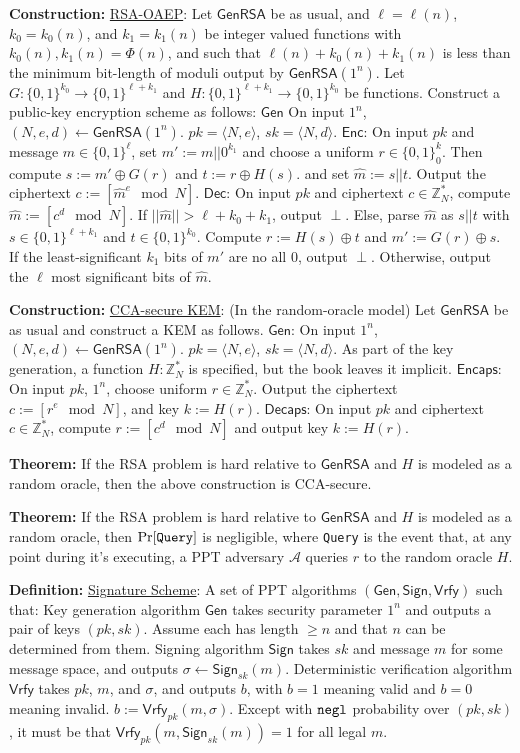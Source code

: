 \documentclass[10pt]{article}
\newcommand{\Z}{\mathbb{Z}}
\newcommand{\AAA}{\mathcal{A}}
\newcommand{\defn}[1]{{\bf Definition:} \underline{#1}}
\newcommand{\thm}[1]{{\bf Theorem:} \underline{#1}}
\newcommand{\con}[1]{{\bf Construction:} \underline{#1}}
\newcommand{\Enc}{\mathsf{Enc}}
\newcommand{\Dec}{\mathsf{Dec}}
\newcommand{\Encaps}{\mathsf{Encaps}}
\newcommand{\Decaps}{\mathsf{Decaps}}
\newcommand{\Sign}{\mathsf{Sign}}
\newcommand{\Vrfy}{\mathsf{Vrfy}}
\newcommand{\Gen}{\mathsf{Gen}}
\newcommand{\GenRSA}{\mathsf{GenRSA}}
\newcommand{\ang}[1]{\langle#1\rangle}
\newcommand{\xor}{\oplus}
\newcommand{\negl}{{\tt negl}}
\newcommand{\from}{\leftarrow}
\begin{document}
\begin{multicols}{3}
\con{RSA-OAEP}: Let $\GenRSA$ be as usual, and $\ell=\ell(n)$, $k_0=k_0(n)$, and $k_1=k_1(n)$ be integer valued functions with $k_0(n),k_1(n)=\Phi(n)$, and such that $\ell(n)+k_0(n)+k_1(n)$ is less than the minimum bit-length of moduli output by $\GenRSA(1^n)$. Let $G:\{0,1\}^{k_0}\to\{0,1\}^{\ell+k_1}$ and $H:\{0,1\}^{\ell+k_1}\to\{0,1\}^{k_0}$ be functions. Construct a public-key encryption scheme as follows: $\Gen$ On input $1^n$, $(N,e,d)\from\GenRSA(1^n)$. $pk=\ang{N,e}$, $sk=\ang{N,d}$. $\Enc$: On input $pk$ and message $m\in\{0,1\}^\ell$, set $m':=m||0^{k_1}$ and choose a uniform $r\in\{0,1\}^k_0$. Then compute $s:=m'\xor G(r)$ and $t:=r\xor H(s)$. and set $\hat{m}:=s||t$. Output the ciphertext $c:=[\hat{m}^e\mod{N}]$. $\Dec$: On input $pk$ and ciphertext $c\in\Z_N^*$, compute $\hat{m}:=[c^d\mod{N}]$. If $||\hat{m}||>\ell+k_0+k_1$, output $\perp$. Else, parse $\hat{m}$ as $s||t$ with $s\in\{0,1\}^{\ell+k_1}$ and $t\in\{0,1\}^{k_0}$. Compute $r:=H(s)\xor t$ and $m':=G(r)\xor s$. If the least-significant $k_1$ bits of $m'$ are no all $0$, output $\perp$. Otherwise, output the $\ell$ most significant bits of $\hat{m}$.

\con{CCA-secure KEM}: (In the random-oracle model) Let $\GenRSA$ be as usual and construct a KEM as follows. $\Gen$: On input $1^n$, $(N,e,d)\from\GenRSA(1^n)$. $pk=\ang{N,e}$, $sk=\ang{N,d}$. As part of the key generation, a function $H:\Z_N^*$ is specified, but the book leaves it implicit. $\Encaps$: On input $pk$, $1^n$, choose uniform $r\in\Z_N^*$. Output the ciphertext $c:=[r^e\mod{N}]$, and key $k:=H(r)$. $\Decaps$: On input $pk$ and ciphertext $c\in\Z_N^*$, compute $r:=[c^d\mod{N}]$ and output key $k:=H(r)$.

\thm{} If the RSA problem is hard relative to $\GenRSA$ and $H$ is modeled as a random oracle, then the above construction is CCA-secure.

\thm{}If the RSA problem is hard relative to $\GenRSA$ and $H$ is modeled as a random oracle, then $\Pr[{\tt Query}]$ is negligible, where {\tt Query} is the event that, at any point during it's executing, a PPT adversary $\AAA$ queries $r$ to the random oracle $H$.

\defn{Signature Scheme}: A set of PPT algorithms $(\Gen,\Sign,\Vrfy)$ such that: Key generation algorithm $\Gen$ takes security parameter $1^n$ and outputs a pair of keys $(pk,sk)$. Assume each has length $\geq n$ and that $n$ can be determined from them. Signing algorithm $\Sign$ takes $sk$ and message $m$ for some message space, and outputs $\sigma\from\Sign_{sk}(m)$. Deterministic verification algorithm $\Vrfy$ takes $pk$, $m$, and $\sigma$, and outputs $b$, with $b=1$ meaning valid and $b=0$ meaning invalid. $b:=\Vrfy_{pk}(m,\sigma)$. Except with $\negl$ probability over $(pk,sk)$, it must be that $\Vrfy_{pk}(m,\Sign_{sk}(m))=1$ for all legal $m$.


\end{multicols}
\end{document}
